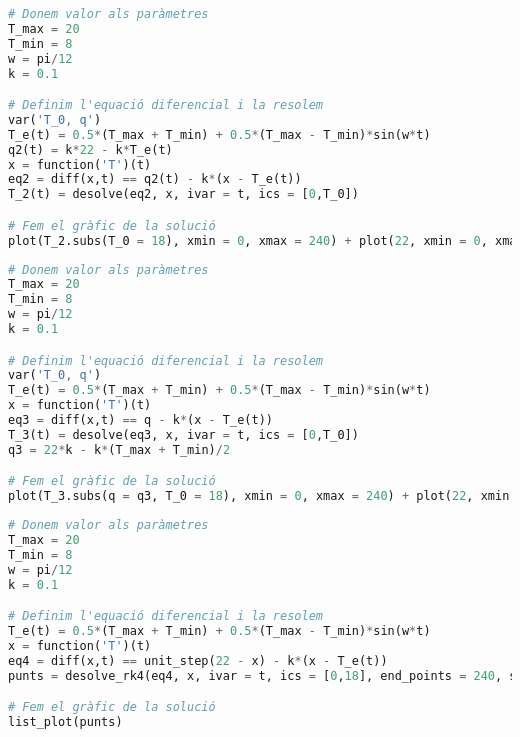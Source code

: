 \documentclass[12pt]{article}
\numberwithin{table}{section}
\numberwithin{figure}{section}
\numberwithin{equation}{section}
\begin{document}
\begin{lstlisting}[language=python, caption=Codi per simular el model amb \( q_2 \), label={lst:codi 2}]
# Donem valor als paràmetres
T_max = 20
T_min = 8
w = pi/12
k = 0.1

# Definim l'equació diferencial i la resolem
var('T_0, q')
T_e(t) = 0.5*(T_max + T_min) + 0.5*(T_max - T_min)*sin(w*t)
q2(t) = k*22 - k*T_e(t)
x = function('T')(t)
eq2 = diff(x,t) == q2(t) - k*(x - T_e(t))
T_2(t) = desolve(eq2, x, ivar = t, ics = [0,T_0])

# Fem el gràfic de la solució
plot(T_2.subs(T_0 = 18), xmin = 0, xmax = 240) + plot(22, xmin = 0, xmax = 240, color = 'green', linestyle = '--')
\end{lstlisting}

\begin{lstlisting}[language=python, caption=Codi per simular el model amb \( q_1' \), label={lst:codi 3}]
# Donem valor als paràmetres
T_max = 20
T_min = 8
w = pi/12
k = 0.1

# Definim l'equació diferencial i la resolem
var('T_0, q')
T_e(t) = 0.5*(T_max + T_min) + 0.5*(T_max - T_min)*sin(w*t)
x = function('T')(t)
eq3 = diff(x,t) == q - k*(x - T_e(t))
T_3(t) = desolve(eq3, x, ivar = t, ics = [0,T_0])
q3 = 22*k - k*(T_max + T_min)/2

# Fem el gràfic de la solució
plot(T_3.subs(q = q3, T_0 = 18), xmin = 0, xmax = 240) + plot(22, xmin = 0, xmax = 240, color = 'green', linestyle = '--')
\end{lstlisting}

\begin{lstlisting}[language=python, caption=Codi per simular el model amb \( q_3 \), label={lst:codi 4}]
# Donem valor als paràmetres
T_max = 20
T_min = 8
w = pi/12
k = 0.1

# Definim l'equació diferencial i la resolem
T_e(t) = 0.5*(T_max + T_min) + 0.5*(T_max - T_min)*sin(w*t)
x = function('T')(t)
eq4 = diff(x,t) == unit_step(22 - x) - k*(x - T_e(t))
punts = desolve_rk4(eq4, x, ivar = t, ics = [0,18], end_points = 240, step = 0.01)

# Fem el gràfic de la solució
list_plot(punts)
\end{lstlisting}
\end{document}

